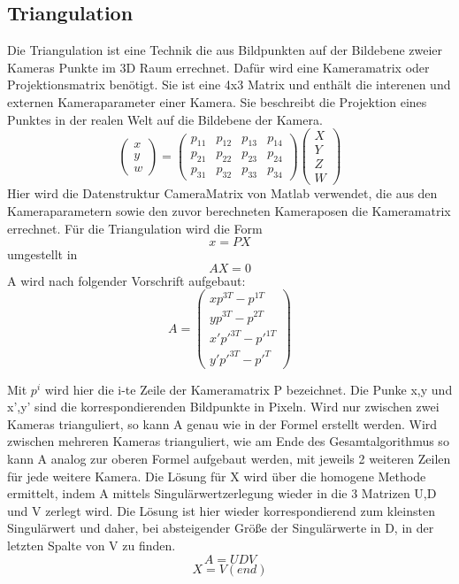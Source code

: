 \subsection{Triangulation}
\label{sec:Triangulation}
Die Triangulation ist eine Technik die aus Bildpunkten auf der Bildebene zweier Kameras Punkte im 3D Raum errechnet. Dafür wird eine Kameramatrix oder Projektionsmatrix benötigt. Sie ist eine 4x3 Matrix und enthält die interenen und externen Kameraparameter einer Kamera.  Sie beschreibt die Projektion eines Punktes in der realen Welt auf die Bildebene der Kamera.
$$ \begin{pmatrix} x\\y\\w \end{pmatrix} =  \begin{pmatrix} p_{11} & p_{12} & p_{13} & p_{14}\\  p_{21} & p_{22} & p_{23} & p_{24} \\  p_{31} & p_{32} & p_{33} & p_{34}  \end{pmatrix} \begin{pmatrix} X\\Y\\Z\\W \end{pmatrix}$$
Hier wird die Datenstruktur CameraMatrix von Matlab verwendet, die aus den Kameraparametern sowie den zuvor berechneten Kameraposen die Kameramatrix errechnet.
Für die Triangulation wird die Form
$$x = PX$$
umgestellt in
$$AX = 0$$
A wird nach folgender Vorschrift aufgebaut:
$$A = \begin{pmatrix} xp^{3T} - p^{1T} \\ yp^{3T} - p^{2T} \\ x'p'^{3T} - p'^{1T} \\ y'p'^{3T} - p'^{T} \end{pmatrix}$$

Mit $p^i$ wird hier die i-te Zeile der Kameramatrix P bezeichnet. Die Punke x,y und x’,y’ sind die korrespondierenden Bildpunkte in Pixeln. Wird nur zwischen zwei Kameras trianguliert, so kann A genau wie in der Formel erstellt werden. Wird zwischen mehreren Kameras trianguliert, wie am Ende des Gesamtalgorithmus so kann A analog zur oberen Formel aufgebaut werden, mit jeweils 2 weiteren Zeilen für jede weitere Kamera.
Die Lösung für X wird über die homogene Methode ermittelt, indem A mittels Singulärwertzerlegung wieder in die 3 Matrizen U,D und V zerlegt wird. Die Lösung ist hier wieder korrespondierend zum kleinsten Singulärwert und daher, bei absteigender Größe der Singulärwerte in D,  in der letzten Spalte von V zu finden. \cite{Richard2000}
$$A = UDV$$
$$X = V(end)$$

\clearpage

